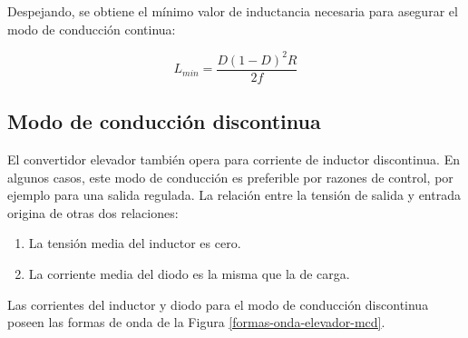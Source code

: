 Despejando, se obtiene el mínimo valor de inductancia necesaria para asegurar el modo de conducción continua:

\begin{equation}
    \boxed{
    L_{min} = \frac{D(1-D)^2R}{2f}
    }
\end{equation}
\subsection{Modo de conducción discontinua}

El convertidor elevador también opera para corriente de inductor discontinua. En algunos casos, este modo de conducción es preferible por razones de control, por ejemplo para una salida regulada. La relación entre la tensión de salida y entrada origina de otras dos relaciones:

\begin{enumerate}
    \item La tensión media del inductor es cero.
    \item La corriente media del diodo es la misma que la de carga.
\end{enumerate}

Las corrientes del inductor y diodo para el modo de conducción discontinua poseen las formas de onda de la Figura \ref{formas-onda-elevador-mcd}.

